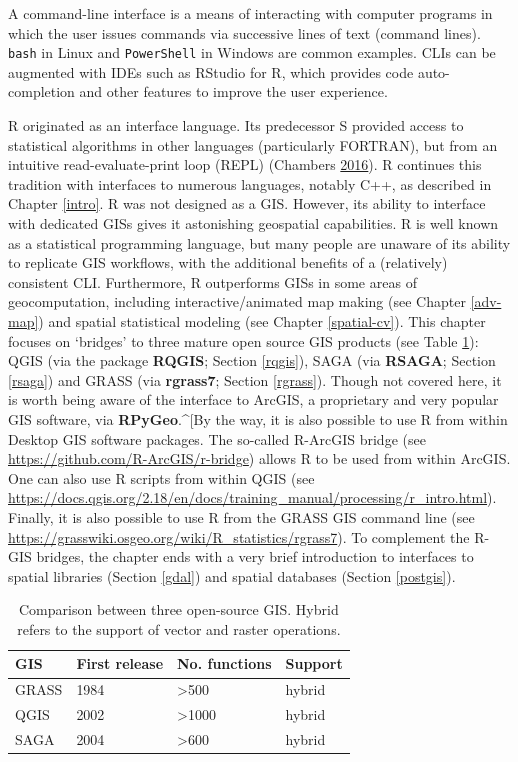\documentclass[]{krantz}
\let\BeginKnitrBlock\begin \let\EndKnitrBlock\end
\begin{document}
\BeginKnitrBlock{rmdnote}
A command-line interface is a means of interacting with computer programs in which the user issues commands via successive lines of text (command lines).
\texttt{bash} in Linux and \texttt{PowerShell} in Windows are common examples.
CLIs can be augmented with IDEs such as RStudio for R, which provides code auto-completion and other features to improve the user experience.
\EndKnitrBlock{rmdnote}

R originated as an interface language.
Its predecessor S provided access to statistical algorithms in other languages (particularly FORTRAN), but from an intuitive read-evaluate-print loop (REPL) (Chambers \protect\hyperlink{ref-chambers_extending_2016}{2016}).
R continues this tradition with interfaces to numerous languages, notably C++, as described in Chapter \ref{intro}.
R was not designed as a GIS.
However, its ability to interface with dedicated GISs gives it astonishing geospatial capabilities.
R is well known as a statistical programming language, but many people are unaware of its ability to replicate GIS workflows, with the additional benefits of a (relatively) consistent CLI.
Furthermore, R outperforms GISs in some areas of geocomputation, including interactive/animated map making (see Chapter \ref{adv-map}) and spatial statistical modeling (see Chapter \ref{spatial-cv}).
This chapter focuses on `bridges' to three mature open source GIS products (see Table \ref{tab:gis-comp}): QGIS (via the package \textbf{RQGIS}; Section \ref{rqgis}), SAGA (via \textbf{RSAGA}; Section \ref{rsaga}) and GRASS (via \textbf{rgrass7}; Section \ref{rgrass}).
Though not covered here, it is worth being aware of the interface to ArcGIS, a proprietary and very popular GIS software, via \textbf{RPyGeo}.\^{}{[}By the way, it is also possible to use R from within Desktop GIS software packages.
The so-called R-ArcGIS bridge (see \url{https://github.com/R-ArcGIS/r-bridge}) allows R to be used from within ArcGIS.
One can also use R scripts from within QGIS (see \url{https://docs.qgis.org/2.18/en/docs/training_manual/processing/r_intro.html}).
Finally, it is also possible to use R from the GRASS GIS command line (see \url{https://grasswiki.osgeo.org/wiki/R_statistics/rgrass7}).
To complement the R-GIS bridges, the chapter ends with a very brief introduction to interfaces to spatial libraries (Section \ref{gdal}) and spatial databases (Section \ref{postgis}).

\begin{table}[t]

\caption[Comparison between three open-source GIS.]{\label{tab:gis-comp}Comparison between three open-source GIS. Hybrid refers to the support of vector and raster operations.}
\centering
\begin{tabular}{llll}
\toprule
GIS & First release & No. functions & Support\\
\midrule
GRASS & 1984 & >500 & hybrid\\
QGIS & 2002 & >1000 & hybrid\\
SAGA & 2004 & >600 & hybrid\\
\bottomrule
\end{tabular}
\end{table}
\end{document}

